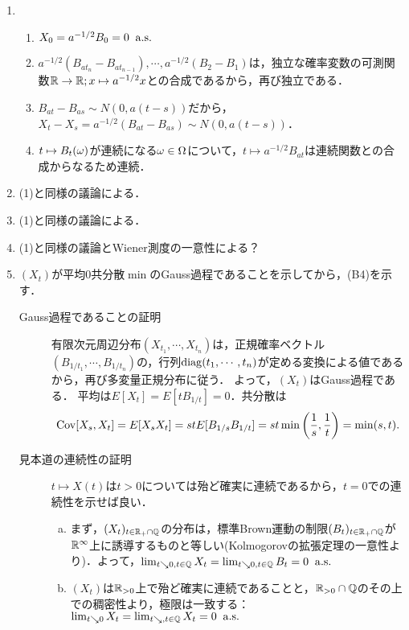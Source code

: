 \documentclass[uplatex,dvipdfmx]{jsreport}
\begin{document}
\begin{Proof}\mbox{}
    \begin{enumerate}
        \item 
        \begin{enumerate}[({B}1)]
            \item $X_0=a^{-1/2}B_0=0\;\;\mathrm{a.s.}$
            \item $a^{-1/2}(B_{at_n}-B_{at_{n-1}}),\cdots,a^{-1/2}(B_{2}-B_{1})$は，独立な確率変数の可測関数$\mathbb{R}\to\mathbb{R};x\mapsto a^{-1/2}x$との合成であるから，再び独立である．
            \item $B_{at}-B_{as}\sim N(0,a(t-s))$だから，$X_t-X_s=a^{-1/2}(B_{at}-B_{as})\sim N(0,a(t-s))$．
            \item $t\mapsto B_t(\omega)$が連続になる$\omega\in\Omega$について，$t\mapsto a^{-1/2}B_{at}$は連続関数との合成からなるため連続．
        \end{enumerate}
        \item (1)と同様の議論による．
        \item (1)と同様の議論による．
        \item (1)と同様の議論とWiener測度の一意性による？
        \item $(X_t)$が平均$0$共分散$\min$のGauss過程であることを示してから，(B4)を示す．
        \begin{description}
            \item[Gauss過程であることの証明] 
            有限次元周辺分布$(X_{t_1},\cdots,X_{t_n})$は，正規確率ベクトル$(B_{1/t_1},\cdots,B_{1/t_n})$の，行列$\mathrm{diag}(t_1,\cdots,t_n)$が定める変換による値であるから，再び多変量正規分布に従う．
            よって，$(X_t)$はGauss過程である．
            平均は$E[X_t]=E[tB_{1/t}]=0$．共分散は
            \[\mathrm{Cov}[X_s,X_t]=E[X_sX_t]=stE[B_{1/s}B_{1/t}]=st\min\left(\frac{1}{s},\frac{1}{t}\right)=\min(s,t).\]
            \item[見本道の連続性の証明]
            $t\mapsto X(t)$は$t>0$については殆ど確実に連続であるから，$t=0$での連続性を示せば良い．
            \begin{enumerate}[(a)]
                \item まず，$(X_t)_{t\in\mathbb{R}_+\cap\mathbb{Q}}$の分布は，標準Brown運動の制限$(B_t)_{t\in\mathbb{R}_+\cap\mathbb{Q}}$が$\mathbb{R}^\infty$上に誘導するものと等しい(Kolmogorovの拡張定理の一意性より)．よって，$\lim_{t\searrow0,t\in\mathbb{Q}}X_t=\lim_{t\searrow0,t\in\mathbb{Q}}B_t=0\;\;\mathrm{a.s.}$
                \item $(X_t)$は$\mathbb{R}_{>0}$上で殆ど確実に連続であることと，$\mathbb{R}_{>0}\cap\mathbb{Q}$のその上での稠密性より，極限は一致する：$\lim_{t\searrow0}X_t=\lim_{t\searrow,t\in\mathbb{Q}}X_t=0\;\;\mathrm{a.s.}$
                

\end{enumerate}
\end{description}
\end{enumerate}
\end{Proof}
\end{document}
